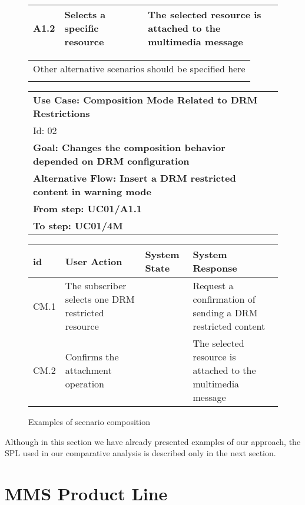 \documentclass{acm_proc_article-sp}
\begin{document}
\begin{figure}[h]
\begin{center}
\begin{tiny}
{\begin{tabular}{|p{0.2in}|p{1in}|p{0.8in}|p{1in}|}
  A1.2 & Selects a specific resource & &  The selected resource is attached to the multimedia message   \\ \hline
  \end{tabular} 
  \begin{tabular}{l} 
     \\
    Other alternative scenarios should be specified here \\ \\
  \end{tabular}
  \begin{tabular}{l}
  {\bf Use Case: Composition Mode Related to DRM Restrictions}  \\ Id: 02 \\ 
  {\bf Goal: Changes the composition behavior depended on DRM configuration}   \\
  {\bf Alternative Flow:  Insert a DRM restricted content in warning mode} \\ 
  {\bf From step: UC01/A1.1 }\\
  {\bf To step: UC01/4M} \\
  \end{tabular}
   \begin{tabular}{|p{0.2in}|p{1in}|p{0.8in}|p{1in}|}
  \hline  
   id & User Action & System State & System Response \\ \hline 
  CM.1  & The subscriber selects one DRM restricted resource & & Request a confirmation of sending a DRM restricted content \\ \hline
  CM.2 & Confirms the attachment operation & &  The selected resource is attached to the multimedia message   \\ \hline
  \end{tabular} 
 } 
\end{tiny}
\end{center}
\caption{Examples of scenario composition}
\label{fig:cc-01}
\end{figure}


Although in this section we have already presented examples of our approach, the SPL used in our comparative analysis is described only in the next section. 


\section{MMS Product Line}
\label{mms-pl}
\end{document}
